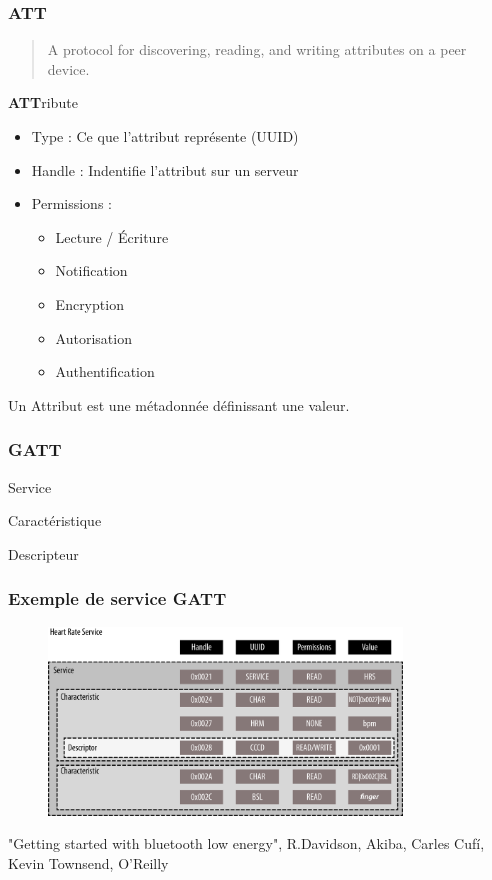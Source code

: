 \begin{frame}
	\frametitle{ATT}
	\begin{quote}A protocol for discovering, reading, and writing attributes on a peer device.\end{quote}

	\begin{block}{\textbf{ATT}ribute}
		\begin{itemize}
			\item Type : Ce que l'attribut représente (UUID)
			\item Handle : Indentifie l'attribut sur un serveur
			\item Permissions :
				\begin{itemize}
					\item Lecture / Écriture
					\item Notification
					\item Encryption
					\item Autorisation
					\item Authentification
				\end{itemize}
		\end{itemize}
	\end{block}
	Un Attribut est une métadonnée définissant une valeur.
\end{frame}

\begin{frame}
	\frametitle{GATT}
	\begin{block}{Service}
	\end{block}
	\begin{block}{Caractéristique}
	\end{block}
	\begin{block}{Descripteur}
	\end{block}
\end{frame}

\begin{frame}
	\frametitle{Exemple de service GATT}
	\begin{figure}
		\includegraphics[height=5cm]{img/gatt.png}
	\end{figure}
{\tiny "Getting started with bluetooth low energy", R.Davidson, Akiba, Carles Cufí, Kevin Townsend, O'Reilly}

\end{frame}

